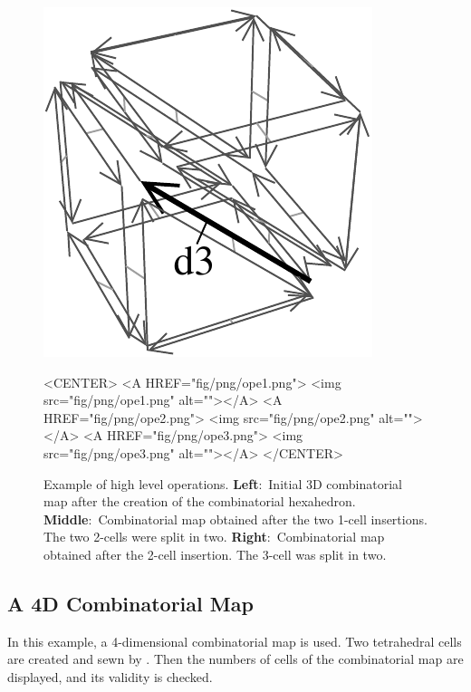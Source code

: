 \begin{figure}
\begin{ccTexOnly}
\begin{center}
      \includegraphics[width=\largFig]{Combinatorial_map/fig/pdf/ope3}
    \end{center}
  \end{ccTexOnly}
  \begin{ccHtmlOnly}
    <CENTER>
    <A HREF="fig/png/ope1.png"> <img src="fig/png/ope1.png" alt=""></A>
    <A HREF="fig/png/ope2.png"> <img src="fig/png/ope2.png" alt=""></A>
    <A HREF="fig/png/ope3.png"> <img src="fig/png/ope3.png" alt=""></A>
    </CENTER>
    \end{ccHtmlOnly}  
      \caption{Example of high level operations.  
        \textbf{Left}:~Initial 3D combinatorial map after the 
        creation of the combinatorial hexahedron.
        \textbf{Middle}:~Combinatorial map obtained after
        the two 1-cell insertions. The two 2-cells were split in two.
        \textbf{Right}:~Combinatorial map obtained after the 2-cell 
        insertion. The 3-cell was split in two.}
    \label{fig_exemple_ope}
\end{figure}


\subsection{A 4D Combinatorial Map}

In this example, a 4-dimensional combinatorial map is used.  Two
tetrahedral cells are created and sewn by \betaquatre{}.  Then the numbers
of cells of the combinatorial map are displayed, and its validity is
checked. 

